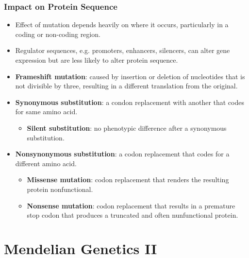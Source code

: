 \documentclass[12pt,a4paper]{article}
\begin{document}
\begin{itemize}
    \subsubsection{Impact on Protein Sequence}
    \begin{itemize}
        \item Effect of mutation depends heavily on where it occurs, particularly in a coding or non-coding region.
        \item Regulator sequences, e.g. promoters, enhancers, silencers, can alter gene expression but are less likely to alter protein sequence.
        \item \textbf{Frameshift mutation}: caused by insertion or deletion of nucleotides that is not divisible by three, resulting in a different translation from the original.
        \item \textbf{Synonymous substitution}: a condon replacement with another that codes for same amino acid. 
            \begin{itemize}
                \item \textbf{Silent substitution}: no phenotypic difference after a synonymous substitution.
            \end{itemize}
        \item \textbf{Nonsynonymous substitution}: a codon replacement that codes for a different amino acid.
            \begin{itemize}
                \item \textbf{Missense mutation}: codon replacement that renders the resulting protein nonfunctional.
                \item \textbf{Nonsense mutation}: codon replacement that results in a premature stop codon that produces a truncated and often nunfunctional protein.
            \end{itemize}
    \end{itemize}
\end{itemize}

\clearpage
\clearpage
\section{Mendelian Genetics II}
\end{document}
